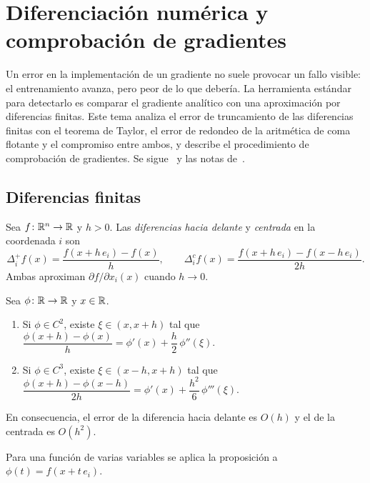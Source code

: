 \chapter{Diferenciación numérica y comprobación de gradientes}
\label{tema:6}

Un error en la implementación de un gradiente no suele provocar un fallo visible: el entrenamiento avanza, pero peor de lo que debería. La herramienta estándar para detectarlo es comparar el gradiente analítico con una aproximación por diferencias finitas. Este tema analiza el error de truncamiento de las diferencias finitas con el teorema de Taylor, el error de redondeo de la aritmética de coma flotante y el compromiso entre ambos, y describe el procedimiento de comprobación de gradientes. Se sigue~\cite[§4.1]{gbc} y las notas de~\cite{cs231n}.

\section{Diferencias finitas}

\begin{definicion}\label{def:diferencias}
Sea $f\colon\mathbb{R}^{n}\to\mathbb{R}$ y $h>0$. Las \emph{diferencias hacia delante} y \emph{centrada} en la coordenada $i$ son
\[
\Delta_i^{+}f(x)=\frac{f(x+h\,e_i)-f(x)}{h},\qquad
\Delta_i^{c}f(x)=\frac{f(x+h\,e_i)-f(x-h\,e_i)}{2h}.
\]
Ambas aproximan $\partial f/\partial x_i(x)$ cuando $h\to 0$.
\end{definicion}

\begin{proposicion}\label{prop:truncamiento}
Sea $\phi\colon\mathbb{R}\to\mathbb{R}$ y $x\in\mathbb{R}$.
\begin{enumerate}
  \item Si $\phi\in C^{2}$, existe $\xi\in(x,x+h)$ tal que $\dfrac{\phi(x+h)-\phi(x)}{h}=\phi'(x)+\dfrac{h}{2}\,\phi''(\xi)$.
  \item Si $\phi\in C^{3}$, existe $\xi\in(x-h,x+h)$ tal que $\dfrac{\phi(x+h)-\phi(x-h)}{2h}=\phi'(x)+\dfrac{h^{2}}{6}\,\phi'''(\xi)$.
\end{enumerate}
En consecuencia, el error de la diferencia hacia delante es $O(h)$ y el de la centrada es $O(h^{2})$.
\end{proposicion}

Para una función de varias variables se aplica la proposición a $\phi(t)=f(x+t\,e_i)$.

